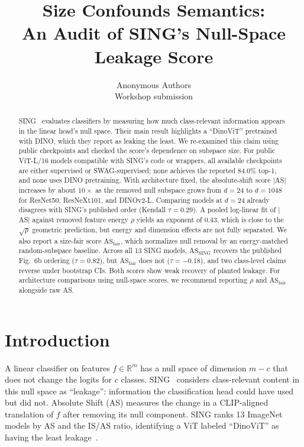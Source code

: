 \documentclass[10pt,twocolumn]{article}
\title{\vspace{-0.6em}Size Confounds Semantics:\\
An Audit of SING's Null-Space Leakage Score\vspace{-0.4em}}
\author{
Anonymous Authors\\
Workshop submission
}
\date{}
\begin{document}
\maketitle
\vspace{-1.2em}

\begin{abstract}
\vspace{-0.3em}
SING~\citep{sing2026} evaluates classifiers by measuring how much class-relevant information appears in the linear head's null space. Their main result highlights a ``DinoViT'' pretrained with DINO, which they report as leaking the least.
We re-examined this claim using public checkpoints and checked the score's dependence on subspace size.
For public ViT-L/16 models compatible with SING's code or wrappers, all available checkpoints are either supervised or SWAG-supervised; none achieves the reported 84.0\% top-1, and none uses DINO pretraining.
With architecture fixed, the absolute-shift score $|$AS$|$ increases by about $10\times$ as the removed null subspace grows from $d{=}24$ to $d{=}1048$ for ResNet50, ResNeXt101, and DINOv2-L. Comparing models at $d{=}24$ already disagrees with SING's published order (Kendall $\tau{=}0.29$).
A pooled log-linear fit of $|$AS$|$ against removed feature energy $\rho$ yields an exponent of $0.43$, which is close to the $\sqrt{\rho}$ geometric prediction, but energy and dimension effects are not fully separated.
We also report a size-fair score $\mathrm{AS}_{\mathrm{fair}}$, which normalizes null removal by an energy-matched random-subspace baseline.
Across all 13 SING models, $\mathrm{AS}_{\mathrm{SING}}$ recovers the published Fig.~6b ordering ($\tau{=}0.82$), but $\mathrm{AS}_{\mathrm{fair}}$ does not ($\tau{=}{-}0.18$), and two class-level claims reverse under bootstrap CIs.
Both scores show weak recovery of planted leakage.
For architecture comparisons using null-space scores, we recommend reporting $\rho$ and $\mathrm{AS}_{\mathrm{fair}}$ alongside raw AS.
\vspace{-0.3em}
\end{abstract}

\section{Introduction}
\vspace{-0.2em}
A linear classifier on features $f\in\mathbb{R}^m$ has a null space of dimension $m{-}c$ that does not change the logits for $c$ classes.
SING~\citep{sing2026} considers class-relevant content in this null space as ``leakage'': information the classification head could have used but did not.
Absolute Shift (AS) measures the change in a CLIP-aligned~\citep{clip2021} translation of $f$ after removing its null component. SING ranks 13 ImageNet models by AS and the IS/AS ratio, identifying a ViT labeled ``DinoViT'' as having the least leakage~\citep{dino2021}.
\end{document}
